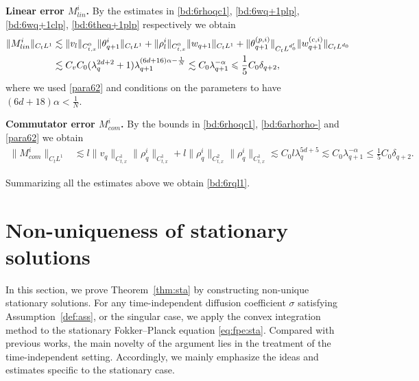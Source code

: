 \documentclass[UTF-8,reqno]{amsart}
\numberwithin{equation}{section}
\theoremstyle{definition}
\def\leq{\leqslant}
\def\leq{\leqslant}
\begin{document}
\textbf{Linear error $M^{i}_{lin}$.} 
By the estimates  
in \eqref{bd:6rhoqc1}, \eqref{bd:6wq+1plp}, \eqref{bd:6wq+1clp},  \eqref{bd:6theq+1plp}  respectively we obtain
\begin{align}
 \|M^{i}_{lin}\|_{C_tL^1}&\lesssim \|v_l\|_{C_{t,x}^0}\|\theta_{q+1}^{i}\|_{C_tL^1}+\|\rho^{i}_l \|_{C_{t,x}^0}
\|w_{q+1}\|_{C_tL^1}+   \| \theta_{q+1}^{(p,i)}\|_{C_tL^{d_0'}}\|w_{q+1}^{(c,i)}\|_{C_tL^{d_0}}\notag\\
&\lesssim C_vC_0(\lambda_{q}^{2d+2}+1)\lambda_{q+1}^{(6d+16)\alpha-\frac1{N}}
\lesssim  C_0 \lambda_{q+1}^{-\alpha}\leq  \frac{1}{5}C_0\delta_{q+2},\notag
\end{align}
where we used  \eqref{para62} and   conditions on the parameters to have $(6d+18)\alpha<\frac{1}{N}$. 

\textbf{Commutator error $M_{com}^i$.} By  the bounds in   \eqref{bd:6rhoqc1}, \eqref{bd:6arhorho-} and \eqref{para62}   we obtain
 \begin{align}
  \|M_{ com}^i\|_{C_tL^1}%
 & \lesssim l\|v_q\|_{C_{t,x}^1}\|\rho_q^i\|_{C_{t,x}^1}+l  \| \rho_q^i\|_{C_{t,x}^2}\| \rho_q^i\|_{C_{t,x}^1}\lesssim C_0 l\lambda_q^{5d+5}\lesssim C_0  \lambda_{q+1}^{-\alpha}\leq \frac{1}{5}C_0\delta_{q+2}.\label{bd:6mcom}
   \end{align}   
   
Summarizing all the estimates above  we obtain   \eqref{bd:6rql1}. 

 

\section{Non-uniqueness of stationary solutions}\label{cogpss4}
In this section, we prove Theorem~\ref{thm:sta} by constructing non-unique stationary solutions. 
For any time-independent diffusion coefficient $\sigma$ satisfying Assumption~\ref{def:ass}, or the singular case, we apply the convex integration method to the stationary Fokker--Planck equation \eqref{eq:fpe:sta}. 
Compared with previous works, the main novelty of the argument lies in the treatment of the time-independent setting. Accordingly, we mainly emphasize the ideas and estimates specific to the stationary case. 
\end{document}
